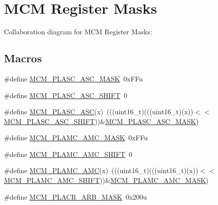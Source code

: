 \hypertarget{group___m_c_m___register___masks}{}\section{M\+CM Register Masks}
\label{group___m_c_m___register___masks}
Collaboration diagram for M\+CM Register Masks\+:
\subsection*{Macros}
\begin{DoxyCompactItemize}
\item 
\#define \hyperlink{group___m_c_m___register___masks_ga215cf860c41174735020a34e7ccf9590}{M\+C\+M\+\_\+\+P\+L\+A\+S\+C\+\_\+\+A\+S\+C\+\_\+\+M\+A\+SK}~0x\+F\+Fu
\item 
\#define \hyperlink{group___m_c_m___register___masks_ga88f833168fd51e1b3c950e21b00bbfc3}{M\+C\+M\+\_\+\+P\+L\+A\+S\+C\+\_\+\+A\+S\+C\+\_\+\+S\+H\+I\+FT}~0
\item 
\#define \hyperlink{group___m_c_m___register___masks_gaaae648a9e1b6e2e44af89bb3a6881a54}{M\+C\+M\+\_\+\+P\+L\+A\+S\+C\+\_\+\+A\+SC}(x)~(((uint16\+\_\+t)(((uint16\+\_\+t)(x))$<$$<$\hyperlink{group___m_c_m___register___masks_ga88f833168fd51e1b3c950e21b00bbfc3}{M\+C\+M\+\_\+\+P\+L\+A\+S\+C\+\_\+\+A\+S\+C\+\_\+\+S\+H\+I\+FT}))\&\hyperlink{group___m_c_m___register___masks_ga215cf860c41174735020a34e7ccf9590}{M\+C\+M\+\_\+\+P\+L\+A\+S\+C\+\_\+\+A\+S\+C\+\_\+\+M\+A\+SK})
\item 
\#define \hyperlink{group___m_c_m___register___masks_ga7988227df54012705c7f522f348214ee}{M\+C\+M\+\_\+\+P\+L\+A\+M\+C\+\_\+\+A\+M\+C\+\_\+\+M\+A\+SK}~0x\+F\+Fu
\item 
\#define \hyperlink{group___m_c_m___register___masks_gaa1b3153d0bf749f80fffacd948dd4bd4}{M\+C\+M\+\_\+\+P\+L\+A\+M\+C\+\_\+\+A\+M\+C\+\_\+\+S\+H\+I\+FT}~0
\item 
\#define \hyperlink{group___m_c_m___register___masks_gad8199ccd7b6edb29bcd5e940d17e7e47}{M\+C\+M\+\_\+\+P\+L\+A\+M\+C\+\_\+\+A\+MC}(x)~(((uint16\+\_\+t)(((uint16\+\_\+t)(x))$<$$<$\hyperlink{group___m_c_m___register___masks_gaa1b3153d0bf749f80fffacd948dd4bd4}{M\+C\+M\+\_\+\+P\+L\+A\+M\+C\+\_\+\+A\+M\+C\+\_\+\+S\+H\+I\+FT}))\&\hyperlink{group___m_c_m___register___masks_ga7988227df54012705c7f522f348214ee}{M\+C\+M\+\_\+\+P\+L\+A\+M\+C\+\_\+\+A\+M\+C\+\_\+\+M\+A\+SK})
\item 
\#define \hyperlink{group___m_c_m___register___masks_gaeea6e96c143304d5bb05ea7fc403efc3}{M\+C\+M\+\_\+\+P\+L\+A\+C\+R\+\_\+\+A\+R\+B\+\_\+\+M\+A\+SK}~0x200u

\end{DoxyCompactItemize}
